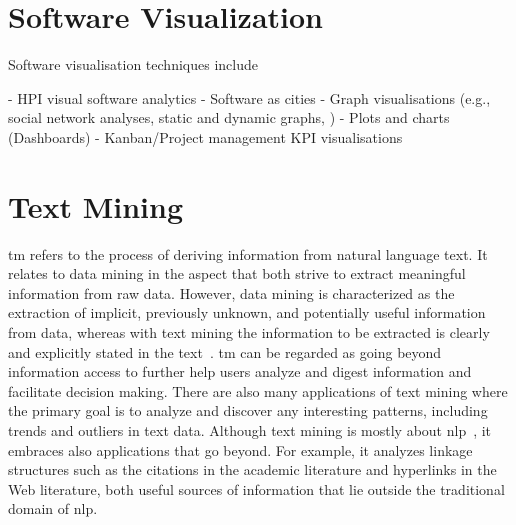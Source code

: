 \section{Software Visualization}
\label{sec:visualization}

Software visualisation techniques include

- HPI visual software analytics 
- Software as cities
- Graph visualisations (e.g., social network analyses, static and dynamic graphs, )
- Plots and charts (Dashboards)
- Kanban/Project management KPI visualisations

\section{Text Mining}
\label{sec:text-mining}


\Gls{tm} refers to the process of deriving information from natural language text. It relates to data mining in the aspect that both strive to extract meaningful information from raw data. However, data mining is characterized as the extraction of implicit, previously unknown, and potentially useful information from data, whereas with text mining the information to be extracted is clearly and explicitly stated in the text~\citep{Witten2004}. 
\Gls{tm} can be regarded as going beyond information access to further help users analyze and digest information and facilitate decision making. There are also many applications of text mining where the primary goal is to analyze and discover any interesting patterns, including trends and outliers in text data.
Although text mining is mostly about \gls{nlp}~\citep{jurafsky2014speech}, it embraces also applications that go beyond. For example, it analyzes linkage structures such as the citations in the academic literature and hyperlinks in the Web literature, both useful sources of information that lie outside the traditional domain of \gls{nlp}. 

